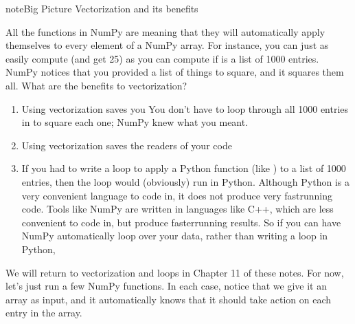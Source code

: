 \documentclass[letterpaper,10pt,english]{jupyterBook}
\begin{document}
\begin{sphinxadmonition}{note}{Big Picture \sphinxhyphen{} Vectorization and its benefits}

\sphinxAtStartPar
All the functions in NumPy are  meaning that they will automatically apply themselves to every element of a NumPy array.  For instance, you can just as easily compute  (and get 25) as you can compute  if  is a list of 1000 entries.  NumPy notices that you provided a list of things to square, and it squares them all.  What are the benefits to vectorization?
\begin{enumerate}
%
\item {} 
\sphinxAtStartPar
Using vectorization saves you   You don’t have to loop through all 1000 entries in  to square each one; NumPy knew what you meant.

\item {} 
\sphinxAtStartPar
Using vectorization saves the readers of your code 

\item {} 
\sphinxAtStartPar
If you had to write a loop to apply a Python function (like ) to a list of 1000 entries, then the loop would (obviously) run in Python.  Although Python is a very convenient language to code in, it does not produce very fast\sphinxhyphen{}running code.  Tools like NumPy are written in languages like C++, which are less convenient to code in, but produce faster\sphinxhyphen{}running results.  So if you can have NumPy automatically loop over your data, rather than writing a loop in Python, 

\end{enumerate}
\end{sphinxadmonition}

\sphinxAtStartPar
We will return to vectorization and loops in Chapter 11 of these notes.  For now, let’s just run a few NumPy functions.  In each case, notice that we give it an array as input, and it automatically knows that it should take action on each entry in the array.

\begin{sphinxVerbatim}[commandchars=\\\{\}]
   
    
\end{sphinxVerbatim}
\end{document}
